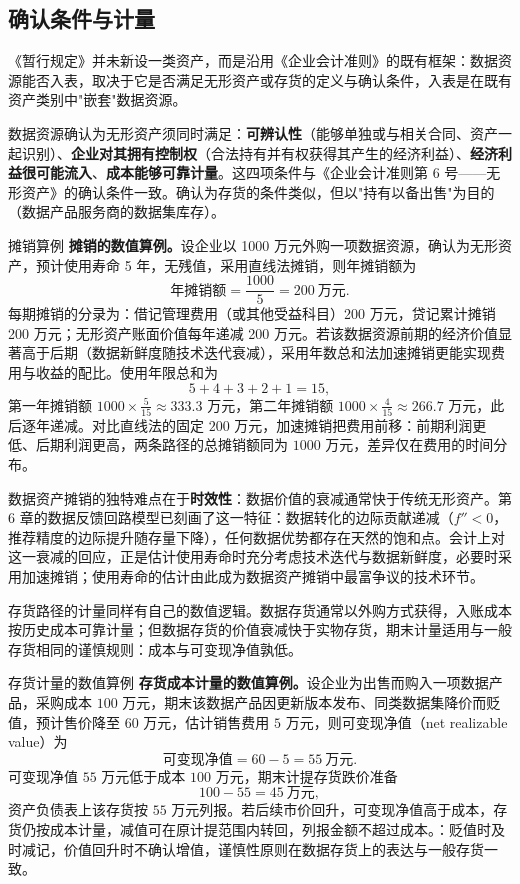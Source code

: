 \subsection{确认条件与计量}

《暂行规定》并未新设一类资产，而是沿用《企业会计准则》的既有框架：数据资源能否入表，取决于它是否满足无形资产或存货的定义与确认条件，入表是在既有资产类别中"嵌套"数据资源。

数据资源确认为无形资产须同时满足：\textbf{可辨认性}（能够单独或与相关合同、资产一起识别）、\textbf{企业对其拥有控制权}（合法持有并有权获得其产生的经济利益）、\textbf{经济利益很可能流入}、\textbf{成本能够可靠计量}。这四项条件与《企业会计准则第 6 号——无形资产》的确认条件一致。确认为存货的条件类似，但以"持有以备出售"为目的（数据产品服务商的数据集库存）。

\begin{derivation}{摊销算例}{}
\textbf{摊销的数值算例。}设企业以 1000 万元外购一项数据资源，确认为无形资产，预计使用寿命 5 年，无残值，采用直线法摊销，则年摊销额为
\[
\text{年摊销额} = \frac{1000}{5} = 200\ \text{万元}.
\]
每期摊销的分录为：借记管理费用（或其他受益科目）200 万元，贷记累计摊销 200 万元；无形资产账面价值每年递减 200 万元。若该数据资源前期的经济价值显著高于后期（数据新鲜度随技术迭代衰减），采用年数总和法加速摊销更能实现费用与收益的配比。使用年限总和为
\[
5 + 4 + 3 + 2 + 1 = 15,
\]
第一年摊销额 $1000 \times \frac{5}{15} \approx 333.3$ 万元，第二年摊销额 $1000 \times \frac{4}{15} \approx 266.7$ 万元，此后逐年递减。对比直线法的固定 $200$ 万元，加速摊销把费用前移：前期利润更低、后期利润更高，两条路径的总摊销额同为 $1000$ 万元，差异仅在费用的时间分布。
\end{derivation}

数据资产摊销的独特难点在于\textbf{时效性}：数据价值的衰减通常快于传统无形资产。第 6 章的数据反馈回路模型已刻画了这一特征：数据转化的边际贡献递减（$f'' < 0$，推荐精度的边际提升随存量下降），任何数据优势都存在天然的饱和点。会计上对这一衰减的回应，正是估计使用寿命时充分考虑技术迭代与数据新鲜度，必要时采用加速摊销；使用寿命的估计由此成为数据资产摊销中最富争议的技术环节。

存货路径的计量同样有自己的数值逻辑。数据存货通常以外购方式获得，入账成本按历史成本可靠计量；但数据存货的价值衰减快于实物存货，期末计量适用与一般存货相同的谨慎规则：成本与可变现净值孰低。

\begin{derivation}{存货计量的数值算例}{}
\textbf{存货成本计量的数值算例。}设企业为出售而购入一项数据产品，采购成本 $100$ 万元，期末该数据产品因更新版本发布、同类数据集降价而贬值，预计售价降至 $60$ 万元，估计销售费用 $5$ 万元，则可变现净值（net realizable value）为
\[
\text{可变现净值} = 60 - 5 = 55\ \text{万元}.
\]
可变现净值 $55$ 万元低于成本 $100$ 万元，期末计提存货跌价准备
\[
100 - 55 = 45\ \text{万元},
\]
资产负债表上该存货按 $55$ 万元列报。若后续市价回升，可变现净值高于成本，存货仍按成本计量，减值可在原计提范围内转回，列报金额不超过成本。：贬值时及时减记，价值回升时不确认增值，谨慎性原则在数据存货上的表达与一般存货一致。
\end{derivation}

